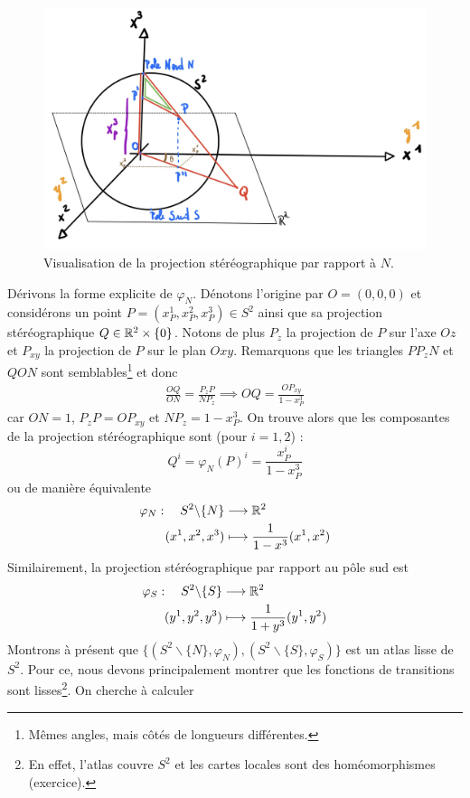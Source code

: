 \begin{figure}[H]
    \centering
    \includegraphics[width=0.7\linewidth]{Chapitres/3.Element de géométrie différentielle/Images/sphère S^2.jpg}
    \caption{Visualisation de la projection stéréographique par rapport à $N$.}
    \label{fig:stereographique 1}
\end{figure}
Dérivons la forme explicite de $\varphi_N$. Dénotons l'origine par $O = (0,0,0)$ et considérons un point $P = (x_P^1,x_P^2,x_P^3)\in S^2$ ainsi que sa projection stéréographique $Q \in \mathbb{R}^2 \times \{0\}$. Notons de plus $P_z$ la projection de $P$ sur l'axe $Oz$ et $P_{xy}$ la projection de $P$ sur le plan $Oxy$. Remarquons que les triangles $PP_zN$ et $QON$ sont semblables\footnote{Mêmes angles, mais côtés de longueurs différentes.} et donc
\begin{align}
    \frac{OQ}{ON} = \frac{P_zP}{NP_z} \implies OQ = \frac{OP_{xy}}{1-x^3_P}
\end{align}
car $ON = 1$, $P_zP = OP_{xy}$ et $NP_z = 1 - x^3_P$. On trouve alors que les composantes de la projection stéréographique sont (pour $i=1,2$) :
\begin{equation}
    Q^i = \varphi_N(P)^i = \frac{x^i_P}{1-x^3_P}
\end{equation}
ou de manière équivalente
\begin{align}
\label{eq:stereoN}
    \varphi_N : \quad S^2\backslash\{N\} &\longrightarrow \mathbb{R}^2 \\ 
    (x^1,x^2,x^3) &\longmapsto \frac{1}{1-x^3} (x^1,x^2)
\end{align}
Similairement, la projection stéréographique par rapport au pôle sud est
\begin{align}
    \label{eq:stereoS}
    \varphi_S: \quad S^2\backslash \{S\} &\longrightarrow \mathbb{R}^2 \\
    (y^1,y^2,y^3) &\longmapsto \frac{1}{1+y^3} (y^1,y^2)
\end{align}
Montrons à présent que $\{ (S^2\backslash\{N\}, \varphi_N), (S^2\backslash\{S\}, \varphi_S)\}$ est un atlas lisse de $S^2$. Pour ce, nous devons principalement montrer que les fonctions de transitions sont lisses\footnote{En effet, l'atlas couvre $S^2$ et les cartes locales sont des homéomorphismes (exercice).}. On cherche à calculer
